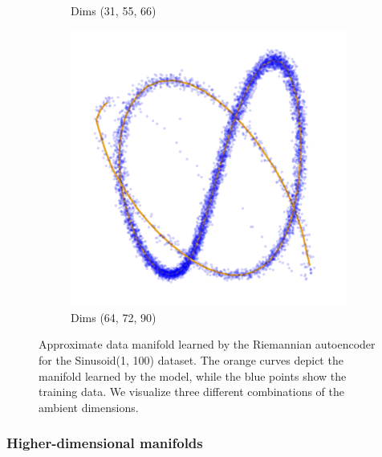 \begin{figure}[htb]
\begin{subfigure}[b]{0.32\textwidth}
            \caption{Dims (31, 55, 66)}
        \end{subfigure}
        \hfill
        \begin{subfigure}[b]{0.32\textwidth}
            \centering
            \includegraphics[width=\textwidth]{chapter5/results/visualisations/RAE/projections/sinusoid_1_100/more_transparent/64_72_90.jpg}
            \caption{Dims (64, 72, 90)}
        \end{subfigure}
    
        \caption{
            Approximate data manifold learned by the Riemannian autoencoder for the Sinusoid(1, 100) dataset. The orange curves depict the manifold learned by the model, while the blue points show the training data. We visualize three different combinations of the ambient dimensions. %
        }
        \label{fig:learned_charts_for_Sinusoid_1_100}
    \end{figure}


\subsubsection{Higher-dimensional manifolds}


